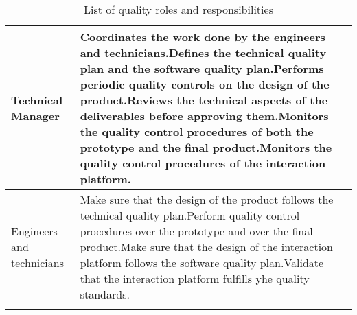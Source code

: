 \begin{longtable}[H]{>{\raggedright\arraybackslash}p{5cm} p{9cm}}
	\midrule
	
	Technical Manager & Coordinates the work done by the engineers and technicians.\vspace{0.3cm}\newline Defines the technical quality plan and the software quality plan.\vspace{0.3cm}\newline Performs periodic quality controls on the design of the product.\vspace{0.3cm}\newline Reviews the technical aspects of the deliverables before approving them.\vspace{0.3cm}\newline Monitors the quality control procedures of both the prototype and the final product.\vspace{0.3cm}\newline Monitors the quality control procedures of the interaction platform.\vspace{0.2cm} \\
	
	\midrule
	
	Engineers and technicians & Make sure that the design of the product follows the technical quality plan.\vspace{0.3cm}\newline Perform quality control procedures over the prototype and over the final product.\vspace{0.3cm}\newline Make sure that the design of the interaction platform follows the software quality plan.\vspace{0.3cm}\newline Validate that the interaction platform fulfills yhe quality standards.\vspace{0.2cm} \\
	
	\bottomrule[2pt]
	
	\caption{List of quality roles and responsibilities}
	
\end{longtable}